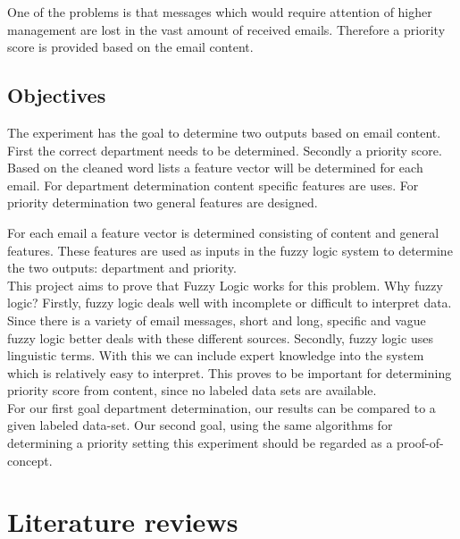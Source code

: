 \documentclass[journal]{IEEEtran}
\begin{document}
One of the problems is that messages which would require attention of higher management are lost in the vast amount of received emails. Therefore a priority score is provided based on the email content.

\subsection{Objectives}

The experiment has the goal to determine two outputs based on email content. First the correct department needs to be determined. Secondly a priority score. Based on the cleaned word lists a feature vector will be determined for each email. For department determination content specific features are uses. For priority determination two general features are designed.

For each email a feature vector is determined consisting of content and general features. These features are used as inputs in the fuzzy logic system to determine the two outputs: department and priority. \\

This project aims to prove that Fuzzy Logic works for this problem. Why fuzzy logic? Firstly, fuzzy logic deals well with incomplete or difficult to interpret data. Since there is a variety of email messages, short and long, specific and vague fuzzy logic better deals with these different sources. Secondly, fuzzy logic uses linguistic terms. With this we can include expert knowledge into the system which is relatively easy to interpret. This proves to be important for determining priority score from content, since no labeled data sets are available.\\

For our first goal department determination, our results can be compared to a given labeled data-set. Our second goal, using the same algorithms for determining a priority setting this experiment should be regarded as a proof-of-concept.

\section{Literature reviews}
\end{document}
